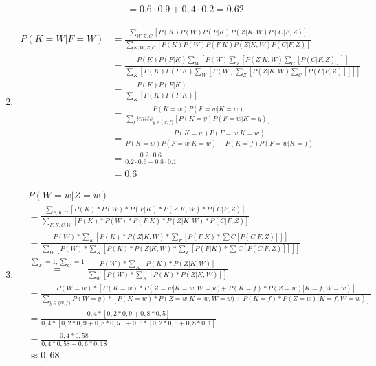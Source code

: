 \documentclass[a4paper,10pt]{article}
\begin{document}
\begin{enumerate}[~~a.)]
\begin{align*}
                &=0.6 \cdot 0.9 + 0,4 \cdot 0.2 = 0.62
            \end{align*}
        \item
            \begin{comment}
            \begin{align*}
            P(K=w|F=w)&=\frac{P(K=w,F=w)}{P(F=w)}\\
            &=\frac{P(K=w)\cdot P(F=w|K=w)}{\sum\limits_{k\in \{w,f\}}^{} P(F=w|K=k) \cdot P(K=k)}\\
            &=\frac{P(K=w)\cdot P(F=w|K=w)}{P(F=w|K=w)\cdot P(K=w)+P(F=w|K=f)\cdot P(K=f)}\\
            &=\frac{0,2 \cdot 0,6}{0,6\cdot 0,+0,1} \approx 0,1714
            \end{align*}
            \end{comment}
            \begin{align*}
                P(K=W|F=W) &=\frac{\sum_{W,Z,C} [P(K)P(W)P(F|K)P(Z|K,W)P(C|F,Z)]}{\sum_{K,W,Z,C} [P(K)P(W)P(F|K)P(Z|K,W)P(C|F,Z)]}\\
                &=\frac{P(K)P(F|K)\sum_W [P(W)\sum_Z [P(Z|K,W) \sum_C [P(C|F,Z)]]]}{\sum_K[P(K)P(F|K)\sum_W [P(W)\sum_Z [P(Z|K,W) \sum_C [P(C|F,Z)]]]]}\\
                &=\frac{P(K)P(F|K)}{\sum_K[P(K)P(F|K)]}\\
                &=\frac{P(K=w)P(F=w|K=w)}{\sum_limits_{y\in \{ w,f\}}^{} [P(K=y)P(F=w|K=y)]}\\
                &=\frac{P(K=w)P(F=w|K=w)}{P(K=w)P(F=w|K=w)+P(K=f)P(F=w|K=f)}\\
                &=\frac{0.2 \cdot 0.6}{0.2 \cdot 0.6 + 0.8 \cdot 0.1}\\
                &=0.6
            \end{align*}
        \item
        \begin{align*}
        	&P(W = w | Z = w) \\
        	&= \frac{\sum_{F,K,C} [P(K) * P(W) * P(F |K) *P(Z|K,W)*P(C|F,Z)]}{\sum_{F,K,C,W} [P(K) * P(W) * P(F |K) *P(Z|K,W)*P(C|F,Z)]}\\
        	&= \frac{P(W) *\sum_{K} [P(K) *P(Z|K,W) * \sum_{F}[P(F |K) * \sum{C}[P(C|F,Z)]]]}{\sum_{W}[P(W) *\sum_{K} [P(K) *P(Z|K,W) * \sum_{F}[P(F |K) * \sum{C}[P(C|F,Z)]]]]}\\
        	&\stackrel{\sum_{F}=1,\sum_{C}=1}= \frac{P(W) *\sum_{K} [P(K) *P(Z|K,W)]}{\sum_{W}[P(W) *\sum_{K} [P(K) *P(Z|K,W)]]}\\
        	&= \frac{P(W = w) * [P(K =w)* P(Z = w|K=w,W=w)+P(K=f)*P(Z=w)|K=f,W=w)]}{\sum_{y \in \{w, f\}}P(W = y) * [P(K =w)* P(Z = w|K=w,W=w)+P(K=f)*P(Z=w)|K=f,W=w)]} \\
        	&= \frac{0,4* [0,2*0,9+0,8*0,5]}{0,4* [0,2*0,9+0,8*0,5] + 0,6 * [0,2*0,5+0,8*0,1]} \\
        	&= \frac{0,4*0,58}{0,4*0,58+0,6*0,18} \\
        	&\approx 0,68
        \end{align*}
    \end{enumerate}
\end{document}
